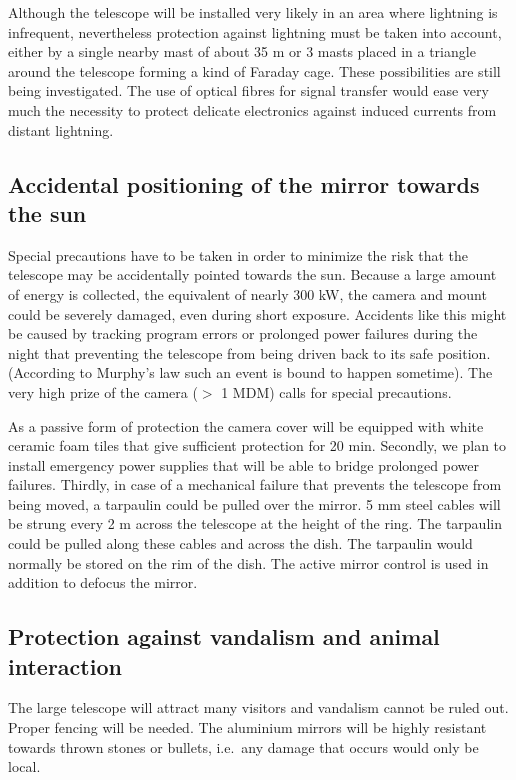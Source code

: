 \medskip Although the telescope will be installed very likely in an area where
lightning is infrequent, nevertheless protection against lightning must be
taken into account, either by a single nearby mast of about 35 m or 3 masts
placed in a triangle around the telescope forming a kind of Faraday cage.
These possibilities are still being investigated. The use of optical fibres
for signal transfer would ease very much the necessity to protect
delicate electronics against induced currents from distant lightning.

\subsection{Accidental positioning of the mirror towards the sun}

\medskip Special precautions have to be taken in order to minimize the
risk that the telescope may be
accidentally pointed towards the sun. Because a large amount of energy is
collected, the equivalent of nearly 300 kW, the camera and mount could be
severely damaged, even during short exposure. Accidents like this might be
caused by tracking program errors or prolonged
power failures during the night that preventing the telescope from being
driven back to its safe position. (According to Murphy's law such an event
is bound to happen sometime). The very high prize of the camera ($>$ 1 MDM)
calls for special precautions.

As a passive form of protection the camera cover will be equipped with white
ceramic foam tiles that give sufficient protection for 20 min. Secondly, we
plan to install emergency power supplies that will be able to bridge
prolonged power failures. Thirdly, in case of a mechanical failure that
prevents the telescope from being moved, a tarpaulin could be pulled over
the mirror. 5 mm steel cables will be strung every 2 m across the telescope
at the height of the ring. The tarpaulin could be pulled along these cables
and across the dish. The tarpaulin would normally be stored on the rim of
the dish. The active mirror control is used
in addition to defocus the mirror.

\subsection{Protection against vandalism and animal interaction}

\medskip The large telescope will attract many visitors and vandalism cannot be ruled
out. Proper fencing will be needed. The aluminium mirrors will be
highly resistant towards thrown stones or bullets, i.e.\, any damage that
occurs would only be local.

